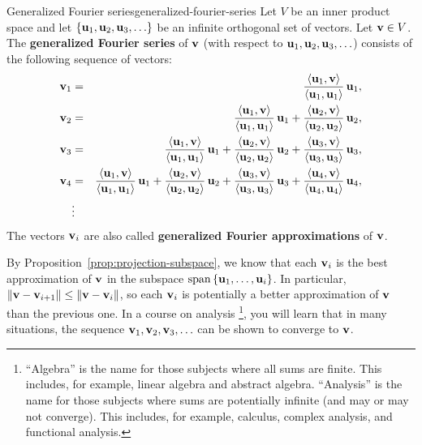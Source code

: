 \begin{definition}{Generalized Fourier series}{generalized-fourier-series}
  Let $V$ be an inner product space and let
  $\set{\vect{u}_1,\vect{u}_2,\vect{u}_3,\ldots}$ be an infinite
  orthogonal set of vectors.  Let $\vect{v}\in V$. The
  \textbf{generalized Fourier series}%
   of $\vect{v}$ (with respect to
  $\vect{u}_1,\vect{u}_2,\vect{u}_3,\ldots$) consists of the following
  sequence of vectors:
  \begin{eqnarray*}
    \vect{v}_1
    &=& \frac{\iprod{\vect{u}_1,\vect{v}}}{\iprod{\vect{u}_1,\vect{u}_1}}\,\vect{u}_1, \\
    \vect{v}_2
    &=& \frac{\iprod{\vect{u}_1,\vect{v}}}{\iprod{\vect{u}_1,\vect{u}_1}}\,\vect{u}_1
        + \frac{\iprod{\vect{u}_2,\vect{v}}}{\iprod{\vect{u}_2,\vect{u}_2}}\,\vect{u}_2, \\
    \vect{v}_3
    &=& \frac{\iprod{\vect{u}_1,\vect{v}}}{\iprod{\vect{u}_1,\vect{u}_1}}\,\vect{u}_1
        + \frac{\iprod{\vect{u}_2,\vect{v}}}{\iprod{\vect{u}_2,\vect{u}_2}}\,\vect{u}_2
        + \frac{\iprod{\vect{u}_3,\vect{v}}}{\iprod{\vect{u}_3,\vect{u}_3}}\,\vect{u}_3, \\
    \vect{v}_4
    &=& \frac{\iprod{\vect{u}_1,\vect{v}}}{\iprod{\vect{u}_1,\vect{u}_1}}\,\vect{u}_1
        + \frac{\iprod{\vect{u}_2,\vect{v}}}{\iprod{\vect{u}_2,\vect{u}_2}}\,\vect{u}_2
        + \frac{\iprod{\vect{u}_3,\vect{v}}}{\iprod{\vect{u}_3,\vect{u}_3}}\,\vect{u}_3
        + \frac{\iprod{\vect{u}_4,\vect{v}}}{\iprod{\vect{u}_4,\vect{u}_4}}\,\vect{u}_4, \\
    &\vdots        &
  \end{eqnarray*}
  The vectors $\vect{v}_i$ are also called \textbf{generalized Fourier
    approximations}%
   of $\vect{v}$.
\end{definition}

By Proposition~\ref{prop:projection-subspace}, we know that each
$\vect{v}_i$ is the best approximation of $\vect{v}$ in the subspace
$\sspan\set{\vect{u}_1,\ldots,\vect{u}_i}$. In particular,
$\norm{\vect{v}-\vect{v}_{i+1}} \leq \norm{\vect{v}-\vect{v}_i}$, so
each $\vect{v}_i$ is potentially a better approximation of $\vect{v}$
than the previous one. In a course on analysis%
\footnote{``Algebra'' is the name for those subjects where all sums
  are finite. This includes, for example, linear algebra and abstract
  algebra. ``Analysis'' is the name for those subjects where sums are
  potentially infinite (and may or may not converge). This includes,
  for example, calculus, complex analysis, and functional analysis.},
you will learn that in many situations, the sequence
$\vect{v}_1,\vect{v}_2,\vect{v}_3,\ldots$ can be shown to converge to
$\vect{v}$.

